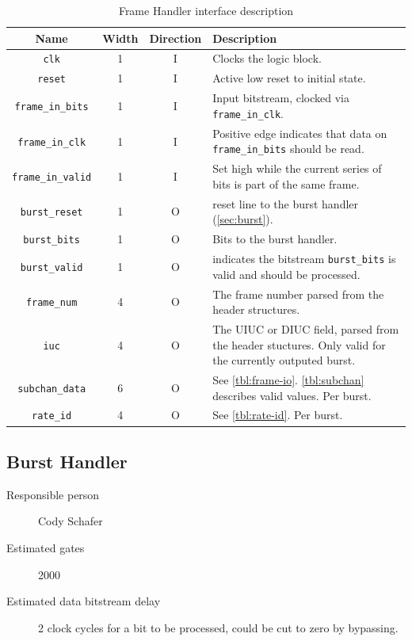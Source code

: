 \documentclass[dvips,10pt,twocolumn]{article}
\newcommand{\wire}{\texttt}
\begin{document}
\begin{table} \begin{tabularx}{\linewidth}{c|c|c|X} \label{tbl:frame-io}
	Name & Width & Direction & Description \\ \hline

	\wire{clk} & 1 & I & Clocks the logic block.\\

	\wire{reset} & 1 & I & Active low reset to initial state. \\


	\wire{frame\_in\_bits} & 1 & I & Input bitstream, clocked via
	\wire{frame\_in\_clk}. \\

	\wire{frame\_in\_clk} & 1 & I & Positive edge indicates that data on
	\wire{frame\_in\_bits} should be read. \\
	
	\wire{frame\_in\_valid} & 1 & I & Set high while the current series
	of bits is part of the same frame. \\

	\wire{burst\_reset} & 1 & O & reset line to the burst handler
	(\autoref{sec:burst}). \\

	\wire{burst\_bits} & 1 & O & Bits to the burst handler. \\

	\wire{burst\_valid} & 1 & O & indicates the bitstream
	\wire{burst\_bits} is valid and should be processed. \\


	\wire{frame\_num} & 4 & O & The frame number parsed from the header
	structures. \\

	\wire{iuc} & 4 & O & The UIUC or DIUC field, parsed from the header
	stuctures. Only valid for the currently outputed burst. \\

	\wire{subchan\_data} & 6 & O & See \autoref{tbl:frame-io}.
	\autoref{tbl:subchan} describes valid values. Per burst. \\

	\wire{rate\_id} & 4 & O & See \autoref{tbl:rate-id}. Per burst. \\

\end{tabularx} \caption{Frame Handler interface description} \end{table}


\subsection{Burst Handler} \label{sec:burst}
\begin{description}
	\item[Responsible person] Cody Schafer 
	\item[Estimated gates] 2000 
	\item[Estimated data bitstream delay] 2 clock cycles for a bit to be
		processed, could be cut to zero by bypassing.
\end{description}
\end{document}
